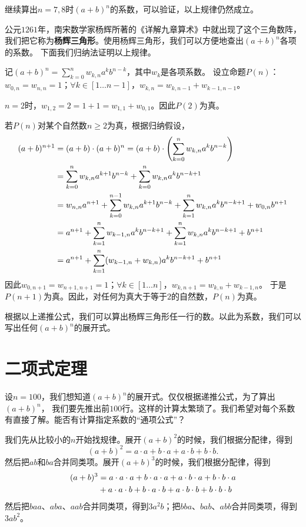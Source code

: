 \documentclass[12pt,UTF8]{ctexbook}
\begin{document}
继续算出$n=7,8$时$(a+b)^n$的系数，可以验证，以上规律仍然成立。

公元$1261$年，南宋数学家杨辉所著的《详解九章算术》中就出现了这个三角数阵，
我们把它称为\textbf{杨辉三角形}。使用杨辉三角形，我们可以方便地查出$(a+b)^n$各项的系数。
下面我们归纳法证明以上规律。

记$(a+b)^n = \sum_{k=0}^n w_{k,n} a^k b^{n-k}$，其中$w_k$是各项系数。
设立命题$P(n)$：$w_{0,n}=w_{n,n}=1$；$\forall k\in[1\ldots n-1]$，$w_{k,n} = w_{k,n-1} + w_{k-1,n-1}$。

$n=2$时，$w_{1,2} = 2 = 1 + 1 = w_{1,1} + w_{0,1}$。因此$P(2)$为真。

若$P(n)$对某个自然数$n\geqslant 2$为真，根据归纳假设，
\begin{align}
 (a+b)^{n+1} &= (a+b)\cdot(a+b)^n = (a+b)\cdot\left(\sum_{k=0}^n w_{k,n} a^k b^{n-k}\right) \notag \\
  &= \sum_{k=0}^n w_{k,n} a^{k+1} b^{n-k} + \sum_{k=0}^n w_{k,n} a^k b^{n-k+1} \notag \\
  &= w_{n,n}a^{n+1} + \sum_{k=0}^{n-1} w_{k,n} a^{k+1} b^{n-k} + \sum_{k=1}^n w_{k,n} a^k b^{n-k+1} + w_{0,n}b^{n+1} \notag \\
  &= a^{n+1} + \sum_{k=1}^{n} w_{k-1,n} a^{k} b^{n-k+1} + \sum_{k=1}^n w_{k,n} a^k b^{n-k+1} + b^{n+1}\notag \\
  &= a^{n+1} + \sum_{k=1}^{n} (w_{k-1,n} + w_{k,n}) a^{k} b^{n-k+1} + b^{n+1} \notag
\end{align}
因此$w_{0,n+1}=w_{n+1,n+1}=1$；$\forall k\in[1\ldots n]$，$w_{k,n+1} = w_{k,n} + w_{k-1,n}$。
于是$P(n+1)$为真。因此，对任何为真大于等于$2$的自然数，$P(n)$为真。

根据以上递推公式，我们可以算出杨辉三角形任一行的数。以此为系数，我们可以写出任何$(a+b)^n$的展开式。

\section{二项式定理}

设$n=100$，我们想知道$(a+b)^n$的展开式。仅仅根据递推公式，为了算出$(a+b)^n$，
我们要先推出前$100$行。这样的计算太繁琐了。我们希望对每个系数有直接了解。能否有计算指定系数的“通项公式”？

我们先从比较小的$n$开始找规律。展开$(a+b)^2$的时候，我们根据分配律，得到
$$ (a+b)^2 = a\cdot a + b\cdot a + a\cdot b + b\cdot b. $$
然后把$ab$和$ba$合并同类项。展开$(a+b)^3$的时候，我们根据分配律，得到
\begin{align}
 (a+b)^3 &= a\cdot a\cdot a + b\cdot a\cdot a + a\cdot b\cdot a + b\cdot b\cdot a\notag \\
  &+ a\cdot a\cdot b + b\cdot a\cdot b + a\cdot b\cdot b + b\cdot b\cdot b \notag 
\end{align}
然后把$baa$、$aba$、$aab$合并同类项，得到$3a^2b$；把$bba$、$bab$、$abb$合并同类项，得到$3ab^2$。
\end{document}
